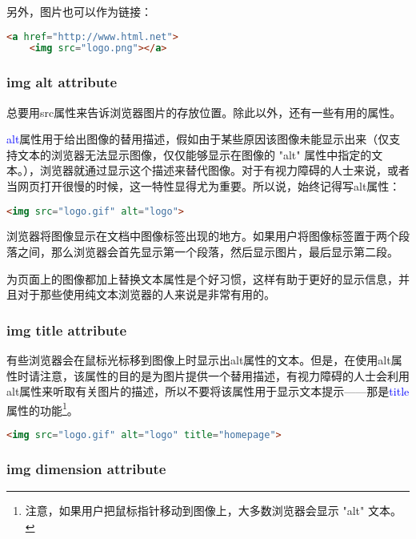 另外，图片也可以作为链接：

\begin{lstlisting}[language=HTML]
	<a href="http://www.html.net">
	<img src="logo.png"></a>
\end{lstlisting}

\subsubsection{img alt attribute}

总要用src属性来告诉浏览器图片的存放位置。除此以外，还有一些有用的属性。

\textcolor{Blue}{alt}属性用于给出图像的替用描述，假如由于某些原因该图像未能显示出来（仅支持文本的浏览器无法显示图像，仅仅能够显示在图像的 "alt" 属性中指定的文本。），浏览器就通过显示这个描述来替代图像。对于有视力障碍的人士来说，或者当网页打开很慢的时候，这一特性显得尤为重要。所以说，始终记得写alt属性：

\begin{lstlisting}[language=HTML]
	<img src="logo.gif" alt="logo">
\end{lstlisting}

浏览器将图像显示在文档中图像标签出现的地方。如果用户将图像标签置于两个段落之间，那么浏览器会首先显示第一个段落，然后显示图片，最后显示第二段。

为页面上的图像都加上替换文本属性是个好习惯，这样有助于更好的显示信息，并且对于那些使用纯文本浏览器的人来说是非常有用的。

\subsubsection{img title attribute}


有些浏览器会在鼠标光标移到图像上时显示出alt属性的文本。但是，在使用alt属性时请注意，该属性的目的是为图片提供一个替用描述，有视力障碍的人士会利用alt属性来听取有关图片的描述，所以不要将该属性用于显示文本提示——那是\textcolor{Blue}{title}属性的功能\footnote{注意，如果用户把鼠标指针移动到图像上，大多数浏览器会显示 "alt" 文本。}。

\begin{lstlisting}[language=HTML]
	<img src="logo.gif" alt="logo" title="homepage">
\end{lstlisting}

\subsubsection{img dimension attribute}

